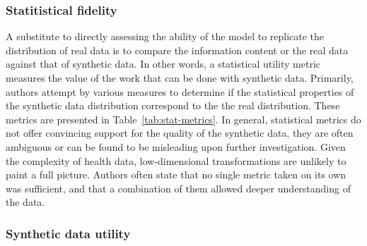 \documentclass[10pt]{article}
\begin{document}
\subsubsection{\texorpdfstring{{Statitistical
fidelity}}{Statitistical fidelity}}

{\label{118181}}

A substitute to directly assessing the ability of the model to replicate
the distribution of real data is to compare the information content or
the real data against that of synthetic data. In other words, a
statistical utility metric measures the value of the work that can be
done with synthetic data. Primarily, authors attempt by various measures
to determine if the statistical properties of the synthetic data
distribution correspond to the the real distribution. These metrics are
presented in Table~{\ref{tab:stat-metrics}}. In
general, statistical metrics do not offer convincing support for the
quality of the synthetic data, they are often ambiguous or can be found
to be misleading upon further investigation. Given the complexity of
health data, low-dimensional transformations are unlikely to paint a
full picture. Authors often state that no single metric taken on its own
was sufficient, and that a combination of them allowed deeper
understanding of the data.

\subsubsection{Synthetic data utility~}

{\label{471516}}
\end{document}
